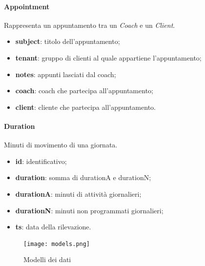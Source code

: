 \paragraph{Appointment}
Rappresenta un appuntamento tra un \textit{Coach} e un \textit{Client}.
\begin{itemize}
    \item \textbf{subject}: titolo dell'appuntamento;
    \item \textbf{tenant}: gruppo di clienti al quale appartiene l'appuntamento;
    \item \textbf{notes}: appunti lasciati dal coach;
    \item \textbf{coach}: coach che partecipa all'appuntamento;
    \item \textbf{client}: cliente che partecipa all'appuntamento.
\end{itemize}
\paragraph{Duration}
Minuti di movimento di una giornata.
\begin{itemize}
    \item \textbf{id}: identificativo;
    \item \textbf{duration}: somma di durationA e durationN;
    \item \textbf{durationA}: minuti di attività giornalieri;
    \item \textbf{durationN}: minuti non programmati giornalieri;
    \item \textbf{ts}: data della rilevazione.
\end{itemize}
\begin{figure}[H]
    \centering
    \texttt{[image: models.png]}
    \caption{Modelli dei dati}
\end{figure}
